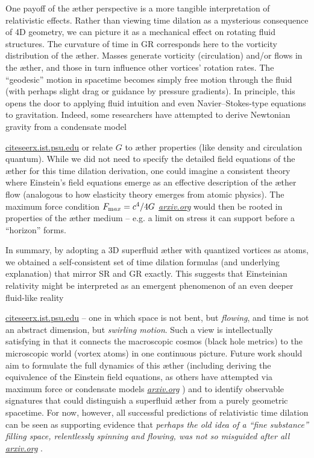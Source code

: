 \documentclass[aps,preprint,superscriptaddress]{revtex4}
\begin{document}
One payoff of the æther perspective is a more tangible interpretation of relativistic effects. Rather than viewing time dilation as a mysterious consequence of 4D geometry, we can picture it as a mechanical effect on rotating fluid structures. The curvature of time in GR corresponds here to the vorticity distribution of the æther. Masses generate vorticity (circulation) and/or flows in the æther, and those in turn influence other vortices’ rotation rates. The “geodesic” motion in spacetime becomes simply free motion through the fluid (with perhaps slight drag or guidance by pressure gradients). In principle, this opens the door to applying fluid intuition and even Navier–Stokes-type equations to gravitation. Indeed, some researchers have attempted to derive Newtonian gravity from a condensate model

\href{https://citeseerx.ist.psu.edu/document?repid=rep1&type=pdf&doi=25483f1ebc9dc442a9f1505a49d96eb35e92e3f4#:~:text=10,2002}{citeseerx.ist.psu.edu}
 or relate $G$ to æther properties (like density and circulation quantum). While we did not need to specify the detailed field equations of the æther for this time dilation derivation, one could imagine a consistent theory where Einstein’s field equations emerge as an effective description of the æther flow (analogous to how elasticity theory emerges from atomic physics). The maximum force condition ${F_{\textrm max}=c^4/4G}$ \href{https://arxiv.org/abs/2205.06302#:~:text=the%20principle%20of%20maximum%20force,The%20limits%20illuminate}{\textit{arxiv.org}}
 would then be rooted in properties of the æther medium – e.g. a limit on stress it can support before a “horizon” forms.


In summary, by adopting a 3D superfluid æther with quantized vortices as atoms, we obtained a self-consistent set of time dilation formulas (and underlying explanation) that mirror SR and GR exactly. This suggests that Einsteinian relativity might be interpreted as an emergent phenomenon of an even deeper fluid-like reality

\href{https://citeseerx.ist.psu.edu/document?repid=rep1&type=pdf&doi=25483f1ebc9dc442a9f1505a49d96eb35e92e3f4#:~:text=45,on%20General%20Relativity%20and%20Relativistic}{citeseerx.ist.psu.edu}
 – one in which space is not bent, but \textit{flowing}, and time is not an abstract dimension, but \textit{swirling motion}. Such a view is intellectually satisfying in that it connects the macroscopic cosmos (black hole metrics) to the microscopic world (vortex atoms) in one continuous picture. Future work should aim to formulate the full dynamics of this æther (including deriving the equivalence of the Einstein field equations, as others have attempted via maximum force or condensate models
\href{https://arxiv.org/abs/2205.06302#:~:text=the%20principle%20of%20maximum%20force,The%20limits%20illuminate}{\textit{arxiv.org}}
) and to identify observable signatures that could distinguish a superfluid æther from a purely geometric spacetime. For now, however, all successful predictions of relativistic time dilation can be seen as supporting evidence that \textit{perhaps the old idea of a “fine substance” filling space, relentlessly spinning and flowing, was not so misguided after all}
\href{https://arxiv.org/pdf/2012.07395#:~:text=Thomson%20on%20the%20right%20path%20when}{\textit{arxiv.org}}
.
\end{document}
